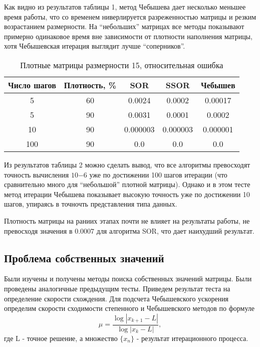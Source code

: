 \documentclass[12pt]{article}
\begin{document}
    Как видно из результатов таблицы 1, метод Чебышева дает несколько меньшее время работы, что со временем ниверлируется разреженностью матрицы  и резким возрастанием размерности. На ``небольших'' матрицах все методы показывают примерно одинаковое время вне зависимости от плотности наполнения матрицы, хотя Чебышевская итерация выглядит лучше ``соперников''.
    
    \begin{table}[h!]
    \caption{Плотные матрицы размерности 15, относительная ошибка}
\begin{center}
 \begin{tabular}{|c|c|c|c|c|} 
 \hline
 Число шагов & Плотность, \% & SOR & SSOR & Чебышев \\
\hline
5 & 60 & 0.0024 & 0.0002 & 0.00017 \\
\hline
5 & 90 & 0.0031 & 0.0001 & 0.0002 \\
\hline
10 & 90 & 0.000003 & 0.000003 & 0.000001 \\
\hline
100 & 90 & 0.0 & 0.0 & 0.0 \\
\hline
\end{tabular}
\end{center}
    \end{table}

	Из результатов таблицы 2 можно сделать вывод, что все алгоритмы превосходят точность вычисления $10{-6}$ уже по достижении 100 шагов итерации (что сравнительно много для ``небольшой'' плотной матрицы). Однако и в этом тесте метод итерации Чебышева показывает высокую точность уже по достижении 10 шагов, упираясь в точночть представления типа данных.
	
	Плотность матрицы на раниих этапах почти не влияет на результаты работы, не превосходя значения в $0.0007$ для алгоритма SOR, что дает наихудший результат.

    {
    	\subsection{Проблема собственных значений}
     }
    
    Были изучены и получены методы поиска собственных значений матрицы. Были проведены аналогичные предыдущим тесты. Приведем результат теста на определение скорости схождения. Для подсчета Чебышевского ускорения определим скорости сходимости степенного и Чебышевского методов по формуле
    $$\mu = \frac{\log |x_{k+1}-L|}{\log| x_k - L|},$$
    где L - точное решение, а множество $\{x_n\}$ - результат итерационного процесса.
        
\end{document}
